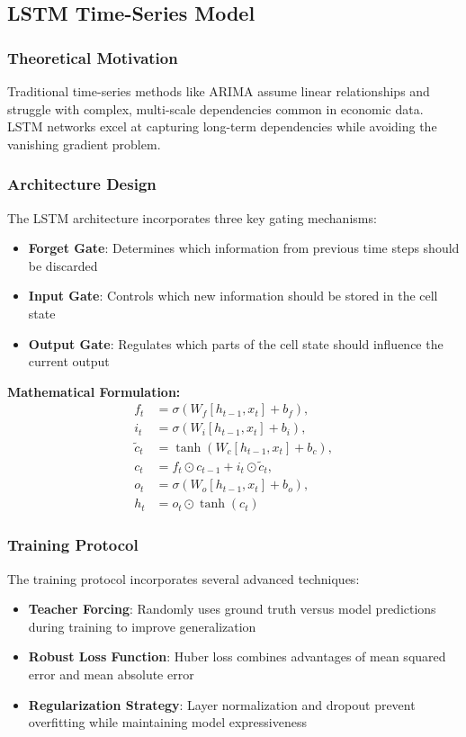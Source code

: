 \subsection{LSTM Time-Series Model}\label{subsec:lstm}

\subsubsection{Theoretical Motivation}
Traditional time-series methods like ARIMA assume linear relationships and struggle with complex, multi-scale dependencies common in economic data. LSTM networks excel at capturing long-term dependencies while avoiding the vanishing gradient problem.

\subsubsection{Architecture Design}
The LSTM architecture incorporates three key gating mechanisms:
\begin{itemize}
    \item \textbf{Forget Gate}: Determines which information from previous time steps should be discarded
    \item \textbf{Input Gate}: Controls which new information should be stored in the cell state
    \item \textbf{Output Gate}: Regulates which parts of the cell state should influence the current output
\end{itemize}

\textbf{Mathematical Formulation:}
\begin{align}
  f_t &= \sigma(W_f [h_{t-1}, x_t] + b_f), \\
  i_t &= \sigma(W_i [h_{t-1}, x_t] + b_i), \\
  \tilde{c}_t &= \tanh(W_c [h_{t-1}, x_t] + b_c), \\
  c_t &= f_t \odot c_{t-1} + i_t \odot \tilde{c}_t, \\
  o_t &= \sigma(W_o [h_{t-1}, x_t] + b_o), \\
  h_t &= o_t \odot \tanh(c_t)
\end{align}

\subsubsection{Training Protocol}
The training protocol incorporates several advanced techniques:
\begin{itemize}
    \item \textbf{Teacher Forcing}: Randomly uses ground truth versus model predictions during training to improve generalization
    \item \textbf{Robust Loss Function}: Huber loss combines advantages of mean squared error and mean absolute error
    \item \textbf{Regularization Strategy}: Layer normalization and dropout prevent overfitting while maintaining model expressiveness
\end{itemize}

